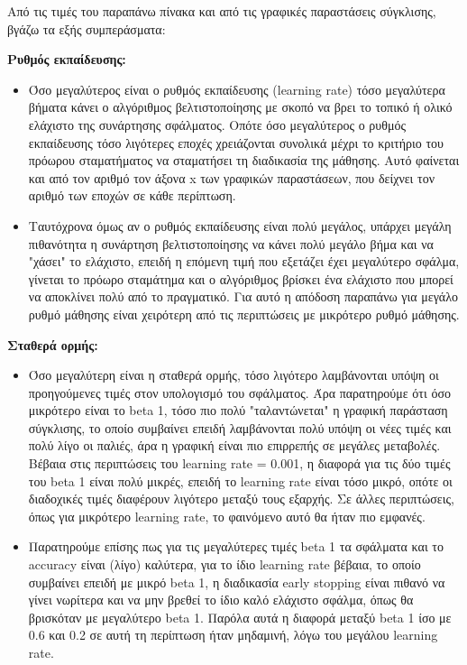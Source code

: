 \documentclass[12pt,a4paper]{article}
\begin{document}
Από τις τιμές του παραπάνω πίνακα και από τις γραφικές παραστάσεις σύγκλισης, βγάζω τα εξής συμπεράσματα:

\textbf{Ρυθμός εκπαίδευσης:}
\begin{itemize}
    \item Όσο μεγαλύτερος είναι ο ρυθμός εκπαίδευσης (learning rate) τόσο μεγαλύτερα βήματα κάνει ο αλγόριθμος βελτιστοποίησης με σκοπό να βρει το τοπικό ή ολικό ελάχιστο της συνάρτησης σφάλματος. Οπότε όσο μεγαλύτερος ο ρυθμός εκπαίδευσης τόσο λιγότερες εποχές χρειάζονται συνολικά μέχρι το κριτήριο του πρόωρου σταματήματος να σταματήσει τη διαδικασία της μάθησης. Αυτό φαίνεται και από τον αριθμό τον άξονα x των γραφικών παραστάσεων, που δείχνει τον αριθμό των εποχών σε κάθε περίπτωση.
    \item Ταυτόχρονα όμως αν ο ρυθμός εκπαίδευσης είναι πολύ μεγάλος, υπάρχει μεγάλη πιθανότητα η συνάρτηση βελτιστοποίησης να κάνει πολύ μεγάλο βήμα και να "χάσει" το ελάχιστο, επειδή η επόμενη τιμή που εξετάζει έχει μεγαλύτερο σφάλμα, γίνεται το πρόωρο σταμάτημα και ο αλγόριθμος βρίσκει ένα ελάχιστο που μπορεί να αποκλίνει πολύ από το πραγματικό. Για αυτό η απόδοση παραπάνω για μεγάλο ρυθμό μάθησης είναι χειρότερη από τις περιπτώσεις με μικρότερο ρυθμό μάθησης.
\end{itemize}

\textbf{Σταθερά ορμής:}
\begin{itemize}
    \item Όσο μεγαλύτερη είναι η σταθερά ορμής, τόσο λιγότερο λαμβάνονται υπόψη οι προηγούμενες τιμές στον υπολογισμό του σφάλματος. Άρα παρατηρούμε ότι όσο μικρότερο είναι το beta 1, τόσο πιο πολύ "ταλαντώνεται" η γραφική παράσταση σύγκλισης, το οποίο συμβαίνει επειδή λαμβάνονται πολύ υπόψη οι νέες τιμές και πολύ λίγο οι παλιές, άρα η γραφική είναι πιο επιρρεπής σε μεγάλες μεταβολές. Βέβαια στις περιπτώσεις του learning rate = 0.001, η διαφορά για τις δύο τιμές του beta 1 είναι πολύ μικρές, επειδή το learning rate είναι τόσο μικρό, οπότε οι διαδοχικές τιμές διαφέρουν λιγότερο μεταξύ τους εξαρχής. Σε άλλες περιπτώσεις, όπως για μικρότερο learning rate, το φαινόμενο αυτό θα ήταν πιο εμφανές.
    \item Παρατηρούμε επίσης πως για τις μεγαλύτερες τιμές beta 1 τα σφάλματα και το accuracy είναι (λίγο) καλύτερα, για το ίδιο learning rate βέβαια, το οποίο συμβαίνει επειδή με μικρό beta 1, η διαδικασία early stopping είναι πιθανό να γίνει νωρίτερα και να μην βρεθεί το ίδιο καλό ελάχιστο σφάλμα, όπως θα βρισκόταν με μεγαλύτερο beta 1. Παρόλα αυτά η διαφορά μεταξύ beta 1 ίσο με 0.6 και 0.2 σε αυτή τη περίπτωση ήταν μηδαμινή, λόγω του μεγάλου learning rate.
\end{itemize}
\end{document}
